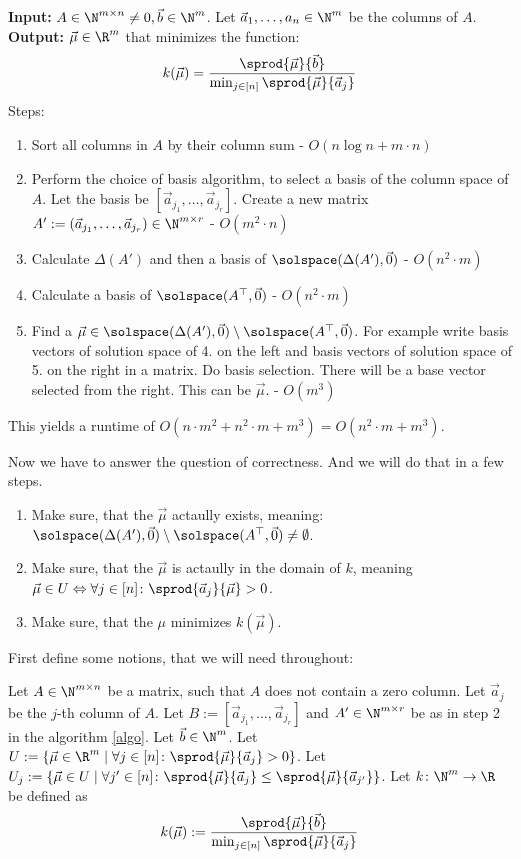 \begin{algorithm}
    \label{_algo}
    \textbf{Input: } $A\in\N^{m\times n} \neq 0, \vec b \in \N^m$. Let $\vec a_1, \dots, a_n\in\N^m$ be the columns of $A$.\\
    \textbf{Output: } $\vec\mu\in\R^m$ that minimizes the function:
    $$k(\vec\mu) = \frac{\sprod{\vec\mu}{\vec b}}{\min_{j\in[n]}\sprod{\vec\mu}{\vec a_j}}$$
    Steps:
    \begin{enumerate}
        \item Sort all columns in $A$ by their column sum - $O(n \log n + m \cdot n)$
        \item Perform the choice of basis algorithm, to select a basis of the column space of $A$. Let the basis be $[\vec a_{j_1}, \dots, \vec a_{j_r}]$. Create a new matrix $A' := (\vec a_{j_1}, \dots, \vec a_{j_r}) \in \N^{m \times r}$ - $O(m^2 \cdot n)$
        \item Calculate $\Delta(A')$ and then a basis of $\solspace(\Delta(A'), \vec0)$ - $O(n^2 \cdot m)$
        \item Calculate a basis of $\solspace(A^\top, \vec0)$ - $O(n^2 \cdot m)$
        \item Find a $\vec\mu \in \solspace(\Delta(A'), \vec0) \setminus \solspace(A^\top, \vec0)$. For example write basis vectors of solution space of 4. on the left and basis vectors of solution space of 5. on the right in a matrix. Do basis selection. There will be a base vector selected from the right. This can be $\vec\mu$. - $O(m^3)$
    \end{enumerate}
    This yields a runtime of $O(n \cdot m^2 + n^2 \cdot m + m^3) = O(n^2 \cdot m + m^3)$.
\end{algorithm}

Now we have to answer the question of correctness. And we will do that in a few steps.
\begin{enumerate}
    \item Make sure, that the $\vec\mu$ actaully exists, meaning: $\solspace(\Delta(A'), \vec0) \setminus \solspace(A^\top, \vec0) \neq \emptyset$.
    \item Make sure, that the $\vec\mu$ is actaully in the domain of $k$, meaning $\vec\mu \in U \Leftrightarrow \forall j \in [n]\colon \sprod{\vec a_j}{\vec\mu}>0$.
    \item Make sure, that the $\mu$ minimizes $k(\vec\mu)$.
\end{enumerate}
First define some notions, that we will need throughout:
\begin{definition}
    \label{def:_algo_basic}
    Let $A \in \N^{m \times n}$ be a matrix, such that $A$ does not contain a zero column. Let $\vec a_j$ be the $j$-th column of $A$. Let $B := [\vec a_{j_1}, \dots, \vec a_{j_r}]$ and $A' \in \N^{m\times r}$ be as in step 2 in the algorithm \ref{algo}. Let $\vec b \in \N^m$. Let $U := \{\vec\mu \in \R^m\mid \forall j \in [n]\colon\sprod{\vec\mu}{\vec a_j} > 0\}$. Let $U_j := \{\vec\mu \in U \mid \forall j'\in[n]\colon \sprod{\vec\mu}{\vec a_j} \leq \sprod{\vec\mu}{\vec a_{j'}}\}$. Let $k\colon \N^m\to\R$ be defined as 
    $$k(\vec\mu) := \frac{\sprod{\vec\mu}{\vec b}}{\min_{j\in[n]}\sprod{\vec\mu}{\vec a_j}}$$
\end{definition}


